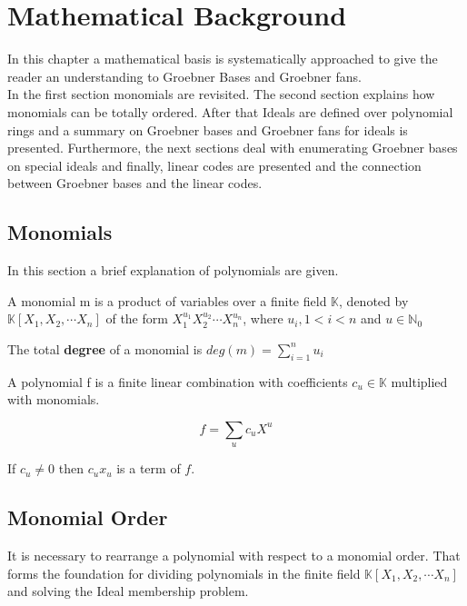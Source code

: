 \section{Mathematical Background}
\label{sec:background}

In this chapter a mathematical basis is systematically approached to give the reader an understanding to Groebner Bases and Groebner fans.\\
In the first section monomials are revisited. The second section explains how monomials can be totally ordered.
After that Ideals are defined over polynomial rings and a summary on Groebner bases and Groebner fans for ideals is presented. Furthermore, the next sections deal with enumerating Groebner bases on special ideals and finally, linear codes are presented and the connection between Groebner bases and the linear codes.  

\subsection{Monomials}
\label{subseb:Monomials}

In this section a brief explanation of polynomials are given.

\begin{env_definition}[Monomial] 

A monomial m is a product of variables over a finite field $\mathbb{K}$, denoted by $ \mathbb{K} \left[X_{1},X_{2},\cdots X_{n}\right]  $ of the form $X_{1}^{u_{1}}X_{2}^{u_{2}}\cdots X_{n}^{u_{n}}$, where $u_{i}, 1 < i < n $ and $u \in \mathbb{N}_{0} $
\end{env_definition}
The total \textbf{degree} of a monomial is $deg(m) = \sum_{i=1}^n u_i $ 


\begin{env_definition}[Polynomial]

A polynomial f is a finite linear combination with coefficients $c_{u} \in \mathbb{K}$ multiplied with monomials.

\[  f = \sum_{u} c_{u}X^{u}\]
\end{env_definition}
If $c_{u}\neq0$ then $c_{u}x_{u}$ is a term of $f$.





\subsection{Monomial Order}
\label{subsec:Monomialorder}
It is necessary to rearrange a polynomial with respect to a monomial order. That forms the foundation for dividing polynomials in the finite field
$ \mathbb{K} \left[X_{1},X_{2},\cdots X_{n}\right]~$ and solving the Ideal membership problem.

